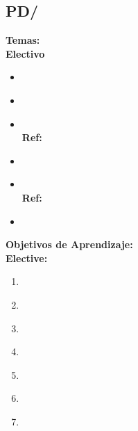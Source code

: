 \subsection{PD/\PDParallelPerformance}\label{sec:BOK:PDParallelPerformance}
\noindent \textbf{Temas:}\\
\noindent \textbf{Electivo}
\begin{itemize}
	\item \PDParallelPerformanceTopicLoad\label{sec:BOK:PDParallelPerformanceTopicLoad}
	\item \PDParallelPerformanceTopicPerformance\label{sec:BOK:PDParallelPerformanceTopicPerformance}
	\item \PDParallelPerformanceTopicScheduling\xspace \\ \textbf{Ref:} \label{sec:BOK:PDParallelPerformanceTopicScheduling}
	\item \PDParallelPerformanceTopicEvaluating\label{sec:BOK:PDParallelPerformanceTopicEvaluating}
	\item \PDParallelPerformanceTopicData\xspace \\ \textbf{Ref:} \label{sec:BOK:PDParallelPerformanceTopicData}
	\item \PDParallelPerformanceTopicPower\label{sec:BOK:PDParallelPerformanceTopicPower}
\end{itemize}


\noindent \textbf{Objetivos de Aprendizaje:}\\
\noindent \textbf{Elective:}
\begin{enumerate}
	\setcounter{enumi}{0}
	\item \PDParallelPerformanceLODetect\xspace[\PDParallelPerformanceLODetectLevel]\label{sec:BOK:PDParallelPerformanceLODetect}
	\item \PDParallelPerformanceLOCalculateThe\xspace[\PDParallelPerformanceLOCalculateTheLevel]\label{sec:BOK:PDParallelPerformanceLOCalculateThe}
	\item \PDParallelPerformanceLODescribeHowLayout\xspace[\PDParallelPerformanceLODescribeHowLayoutLevel]\label{sec:BOK:PDParallelPerformanceLODescribeHowLayout}
	\item \PDParallelPerformanceLODetectAnd\xspace[\PDParallelPerformanceLODetectAndLevel]\label{sec:BOK:PDParallelPerformanceLODetectAnd}
	\item \PDParallelPerformanceLOExplainTheScheduling\xspace[\PDParallelPerformanceLOExplainTheSchedulingLevel]\label{sec:BOK:PDParallelPerformanceLOExplainTheScheduling}
	\item \PDParallelPerformanceLOExplainPerformance\xspace[\PDParallelPerformanceLOExplainPerformanceLevel]\label{sec:BOK:PDParallelPerformanceLOExplainPerformance}
	\item \PDParallelPerformanceLOExplainTheTrade\xspace[\PDParallelPerformanceLOExplainTheTradeLevel]\label{sec:BOK:PDParallelPerformanceLOExplainTheTrade}
\end{enumerate}


